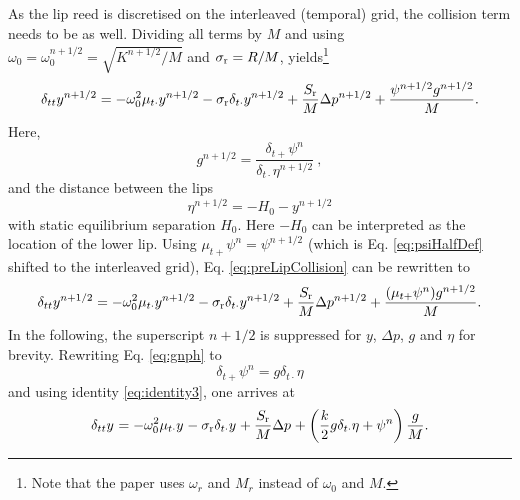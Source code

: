 As the lip reed is discretised on the interleaved (temporal) grid, the collision term needs to be as well. Dividing all terms by $M$ and using $\omega_0 = \omega_0^{n+1/2} = \sqrt{K^{n+1/2}/M}$ and $\sigma_{\text{r}} = R/M$, yields\footnote{Note that the paper uses $\omega_r$ and $M_r$ instead of $\omega_0$ and $M$.}
\begin{equation}\label{eq:preLipCollision}
    \delta_{tt}y^{n+1/2} = -\omega_0^2\mu_{t\cdot}y^{n+1/2}-\sigma_\text{r}\delta_{t\cdot}y^{n+1/2} + \frac{S_\text{r}}{M}\Delta p^{n+1/2} + \frac{\psi^{n+1/2}g^{n+1/2}}{M}.
\end{equation}
Here,
\begin{equation}\label{eq:gnph}
    g^{n+1/2} = \frac{\delta_{t+}\psi^n}{\delta_{t\cdot}\eta^{n+1/2}}\ ,
\end{equation}
and the distance between the lips
\begin{equation}\label{eq:etaBarrier}
    \eta^{n+1/2} = -H_0 - y^{n+1/2}
\end{equation}
with static equilibrium separation $H_0$. Here $-H_0$ can be interpreted as the location of the lower lip.
Using $\mu_{t+}\psi^n = \psi^{n+1/2}$ (which is Eq. \eqref{eq:psiHalfDef} shifted to the interleaved grid), Eq. \eqref{eq:preLipCollision} can be rewritten to
\begin{equation*}
    \delta_{tt}y^{n+1/2} = -\omega_0^2\mu_{t\cdot}y^{n+1/2}-\sigma_\text{r}\delta_{t\cdot}y^{n+1/2} + \frac{S_\text{r}}{M}\Delta p^{n+1/2} + \frac{(\mu_{t+}\psi^n)g^{n+1/2}}{M}.
\end{equation*}
In the following, the superscript $n+1/2$ is suppressed for $y$, $\Delta p$, $g$ and $\eta$ for brevity. Rewriting Eq. \eqref{eq:gnph} to
\begin{equation}\label{eq:rewrittenPsi}
    \delta_{t+}\psi^n = g\delta_{t\cdot}\eta
\end{equation}
and using identity \eqref{eq:identity3}, one arrives at
\begin{equation}\label{eq:lipReedFDSCollision}
    \delta_{tt}y^{} = -\omega_0^2\mu_{t\cdot}y^{}-\sigma_\text{r}\delta_{t\cdot}y^{} + \frac{S_\text{r}}{M}\Delta p^{} + \left(\frac{k}{2}g\delta_{t\cdot}\eta + \psi^n\right)\frac{g}{M}.
\end{equation}
